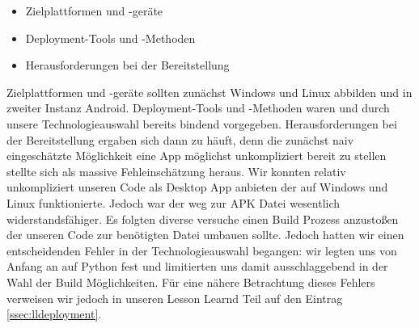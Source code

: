 		\begin{itemize}
			\item Zielplattformen und -geräte
			\item Deployment-Tools und -Methoden
			\item Herausforderungen bei der Bereitstellung
		\end{itemize}
		
		\noindent Zielplattformen und -geräte sollten zunächst Windows und Linux abbilden und in zweiter Instanz Android. Deployment-Tools und -Methoden waren und durch unsere Technologieauswahl bereits bindend vorgegeben. Herausforderungen bei der Bereitstellung ergaben sich dann zu häuft, denn die zunächst naiv eingeschätzte Möglichkeit eine App möglichst unkompliziert bereit zu stellen stellte sich als massive Fehleinschätzung heraus. Wir konnten relativ unkompliziert unseren Code als Desktop App anbieten der auf Windows und Linux funktionierte. Jedoch war der weg zur APK Datei wesentlich widerstandsfähiger. Es folgten diverse versuche einen Build Prozess anzustoßen der unseren Code zur benötigten Datei umbauen sollte. Jedoch hatten wir einen entscheidenden Fehler in der Technologieauswahl begangen: wir legten uns von Anfang an auf Python fest und limitierten uns damit ausschlaggebend in der Wahl der Build Möglichkeiten. Für eine nähere Betrachtung dieses Fehlers verweisen wir jedoch in unseren Lesson Learnd Teil auf den Eintrag \ref{ssec:lldeployment}.